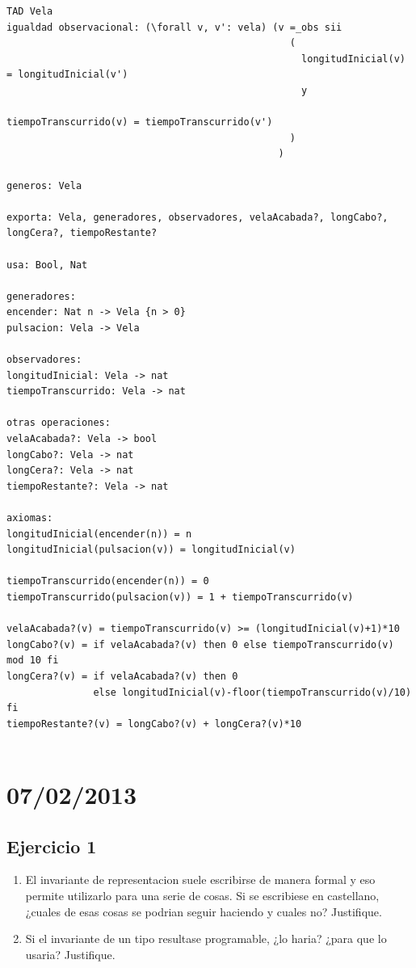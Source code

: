 \documentclass[10pt, a4paper]{report}
\begin{document}
\newpage
\begin{verbatim}
TAD Vela
igualdad observacional: (\forall v, v': vela) (v =_obs sii 
                                                 ( 
                                                   longitudInicial(v) = longitudInicial(v') 
                                                   y 
                                                   tiempoTranscurrido(v) = tiempoTranscurrido(v')
                                                 )
                                               )

generos: Vela

exporta: Vela, generadores, observadores, velaAcabada?, longCabo?, longCera?, tiempoRestante?

usa: Bool, Nat

generadores:
encender: Nat n -> Vela {n > 0}
pulsacion: Vela -> Vela

observadores:
longitudInicial: Vela -> nat
tiempoTranscurrido: Vela -> nat

otras operaciones:
velaAcabada?: Vela -> bool
longCabo?: Vela -> nat
longCera?: Vela -> nat
tiempoRestante?: Vela -> nat

axiomas:
longitudInicial(encender(n)) = n
longitudInicial(pulsacion(v)) = longitudInicial(v)

tiempoTranscurrido(encender(n)) = 0
tiempoTranscurrido(pulsacion(v)) = 1 + tiempoTranscurrido(v)

velaAcabada?(v) = tiempoTranscurrido(v) >= (longitudInicial(v)+1)*10
longCabo?(v) = if velaAcabada?(v) then 0 else tiempoTranscurrido(v) mod 10 fi
longCera?(v) = if velaAcabada?(v) then 0 
               else longitudInicial(v)-floor(tiempoTranscurrido(v)/10) fi
tiempoRestante?(v) = longCabo?(v) + longCera?(v)*10


\end{verbatim}

\newpage
\section{07/02/2013}

\subsection*{Ejercicio 1}

\begin{enumerate}
 \item El invariante de representacion suele escribirse de manera formal y eso permite utilizarlo para una serie de cosas. Si se escribiese en castellano, ¿cuales de esas cosas se podrian seguir haciendo y cuales no? Justifique.
 \item Si el invariante de un tipo resultase programable, ¿lo haria? ¿para que lo usaria? Justifique.
\end{enumerate}
\end{document}
